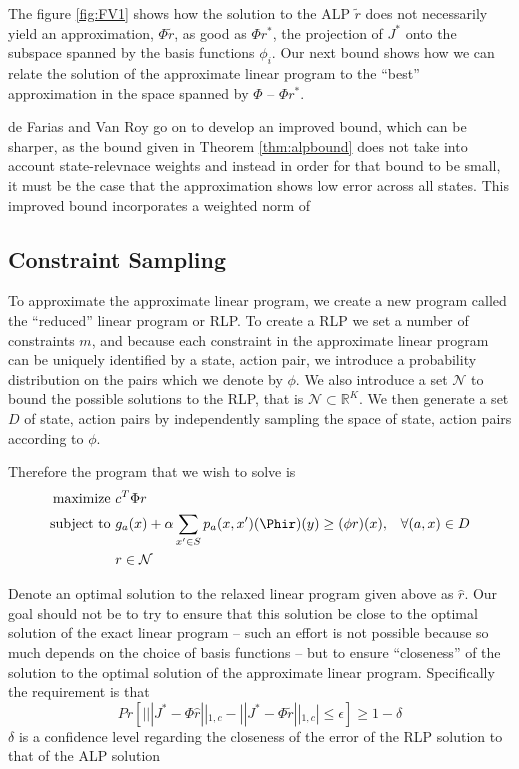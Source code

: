 \documentclass[12pt,reqno]{amsart}
\newcommand{\R}{\ensuremath{\mathbb{R}}}
\newcommand{\sN}{\mathcal{N}}
\numberwithin{equation}{section}
\begin{document}
The figure \ref{fig:FV1} shows how the solution to the ALP $\tilde{r}$ does not necessarily yield an approximation, $\Phi\tilde{r}$, as good as $\Phi r^*$, the projection of $J^*$ onto the subspace spanned by the basis functions $\phi_i$. Our next bound shows how we can relate the solution of the approximate linear program to the ``best'' approximation in the space spanned by $\Phi$ -- $\Phi r^*$.



de Farias and Van Roy go on to develop an improved bound, which can be sharper, as the bound given in Theorem \ref{thm:alpbound} does not take into account state-relevnace weights and instead in order for that bound to be small, it must be the case that the approximation shows low error across all states. This improved bound incorporates a weighted norm of 

\subsection{Constraint Sampling}

To approximate the approximate linear program, we create a new program called the ``reduced'' linear program or RLP. To create a RLP we set a number of constraints $m$, and because each constraint in the approximate linear program can be uniquely identified by a state, action pair, we introduce a probability distribution on the pairs which we denote by $\phi$. We also introduce a set $\sN$ to bound the possible solutions to the RLP, that is $\sN \subset \R^K$. We then generate a set $D$ of state, action pairs by independently sampling the space of state, action pairs according to $\phi$.

Therefore the program that we wish to solve is
\begin{align*}
\text{maximize } & c^T \Phi r & \\
\text{subject to } & g_a(x) + \alpha \sum_{x' \in S} p_a(x,x')(\Phir)(y) \geq (\phi r) (x), & \forall (a,x) \in D \\
& r \in \sN & \\
\end{align*}

Denote an optimal solution to the relaxed linear program given above as $\hat{r}$. Our goal should not be to try to ensure that this solution be close to the optimal solution of the exact linear program -- such an effort is not possible because so much depends on the choice of basis functions -- but to ensure ``closeness'' of the solution to the optimal solution of the approximate linear program. Specifically the requirement is that
$$
Pr[ | ||J^* - \Phi\hat{r}||_{1,c} - ||J^* - \Phi \tilde{r}||_{1,c}| \leq \epsilon ] \geq 1 -\delta
$$
$\delta$ is a confidence level regarding the closeness of the error of the RLP solution to that of the ALP solution
\end{document}
